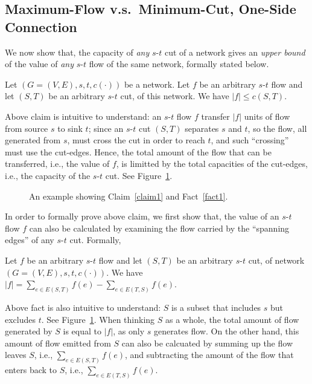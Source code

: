 \subsection*{Maximum-Flow v.s.\ Minimum-Cut, One-Side Connection}

We now show that, the capacity of \emph{any} $s$-$t$ cut of a network
gives an \emph{upper bound} of the value of \emph{any} $s$-$t$ flow of the same network, 
formally stated below.
\begin{claim} \label{claim1}
Let $(G=(V, E), s, t, c(\cdot))$ be a network.
Let $f$ be an arbitrary $s$-$t$ flow and let $(S, T)$ be an arbitrary $s$-$t$ cut, of this network.
We have $|f| \le c(S, T)$.
\end{claim}

Above claim is intuitive to understand: an $s$-$t$ flow $f$ transfer $|f|$ units of flow from source $s$ to sink $t$;
since an $s$-$t$ cut $(S, T)$ separates $s$ and $t$, so the flow, all generated from $s$, must cross the cut in order to reach $t$,
and such ``crossing'' must use the cut-edges.
Hence, the total amount of the flow that can be transferred, i.e., the value of $f$, is limitted by
the total capacities of the cut-edges, i.e., the capacity of the $s$-$t$ cut.
See Figure~\ref{fig:claim}.

\begin{figure}[h]
\centering{}
\caption{An example showing Claim~\ref{claim1} and Fact~\ref{fact1}.}
\label{fig:claim}
\end{figure}


In order to formally prove above claim, we first show that, the value of an $s$-$t$ flow $f$
can also be calculated by examining the flow carried by the ``spanning edges'' of any $s$-$t$ cut.
Formally,
\begin{fact} \label{fact1}
Let $f$ be an arbitrary $s$-$t$ flow and let $(S, T)$ be an arbitrary $s$-$t$ cut, of network $(G=(V, E), s, t, c(\cdot))$.
We have $|f| = \sum_{e\in E(S, T)} f(e) - \sum_{e\in E(T, S)} f(e)$.
\end{fact}

Above fact is also intuitive to understand: $S$ is a subset that includes $s$ but excludes $t$.
See Figure~\ref{fig:claim}.
When thinking $S$ as a whole, 
the total amount of flow generated by $S$ is equal to $|f|$, as only $s$ generates flow.
On the other hand, this amount of flow emitted from $S$ 
can also be calcuated by summing up the flow leaves $S$, i.e., $\sum_{e\in E(S, T)} f(e)$,
and subtracting the amount of the flow that enters back to $S$, i.e., $\sum_{e\in E(T, S)} f(e)$.

